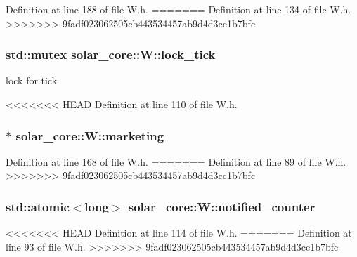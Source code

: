 Definition at line 188 of file W.\+h.
=======
Definition at line 134 of file W.\+h.
>>>>>>> 9fadf023062505cb443534457ab9d4d3cc1b7bfc

\hypertarget{classsolar__core_1_1_w_a56ba20ee51f5db7288e55bb65f12511b}{}
\subsubsection[{lock\+\_\+tick}]{\setlength{\rightskip}{0pt plus 5cm}std\+::mutex solar\+\_\+core\+::\+W\+::lock\+\_\+tick}\label{classsolar__core_1_1_w_a56ba20ee51f5db7288e55bb65f12511b}
lock for tick 

<<<<<<< HEAD
Definition at line 110 of file W.\+h.

\hypertarget{classsolar__core_1_1_w_a93f277fb3a9d9e7b1e911c6a494c8ec8}{}
\subsubsection[{marketing}]{$\ast$ solar\+\_\+core\+::\+W\+::marketing}\label{classsolar__core_1_1_w_a93f277fb3a9d9e7b1e911c6a494c8ec8}


Definition at line 168 of file W.\+h.
=======
Definition at line 89 of file W.\+h.
>>>>>>> 9fadf023062505cb443534457ab9d4d3cc1b7bfc

\hypertarget{classsolar__core_1_1_w_afee32d515534826a60ddf12936f85a3d}{}
\subsubsection[{notified\+\_\+counter}]{\setlength{\rightskip}{0pt plus 5cm}std\+::atomic$<$long$>$ solar\+\_\+core\+::\+W\+::notified\+\_\+counter}\label{classsolar__core_1_1_w_afee32d515534826a60ddf12936f85a3d}


<<<<<<< HEAD
Definition at line 114 of file W.\+h.
=======
Definition at line 93 of file W.\+h.
>>>>>>> 9fadf023062505cb443534457ab9d4d3cc1b7bfc

\hypertarget{classsolar__core_1_1_w_a0d06bc7242f8b3958986118eb217583f}{}
